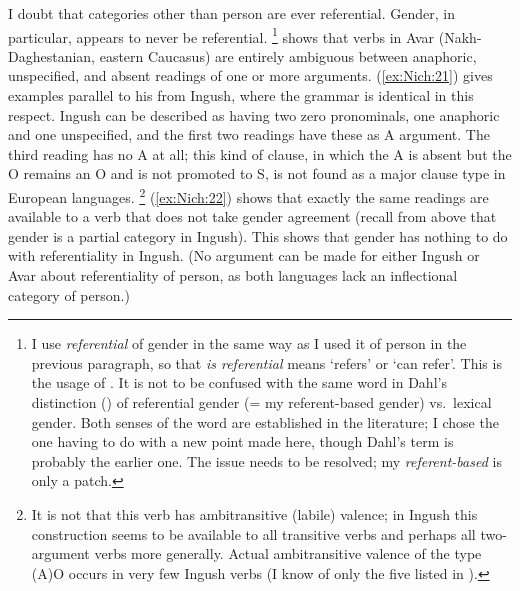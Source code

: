 \documentclass[output=collectionpaper]{langsci/langscibook}
\begin{document}
I doubt that categories other than person are ever referential.  Gender, in particular, appears to never be referential.%
\footnote{%
\label{fn:Nich:15}
I use \textit{referential} of gender in the same way as I used it of person in the previous paragraph, so that \textit{is referential} means `refers' or `can refer'.  This is the usage of \citet{Kibrik2011}.  It is not to be confused with the same word in Dahl's distinction (\citealt*{Dahl2000a}) of referential gender (= my referent-based gender) vs.\ lexical gender.  Both senses of the word are established in the literature; I chose the one having to do with a new point made here, though Dahl's term is probably the earlier one.  The issue needs to be resolved; my \textit{referent-based} is only a patch.
} %
\citet{Creissels2014b} shows that verbs in Avar (Nakh-Daghestanian, eastern Caucasus) are entirely ambiguous between anaphoric, unspecified, and absent readings of one or more arguments. (\ref{ex:Nich:21}) gives examples parallel to his from Ingush, where the grammar is identical in this respect. Ingush can be described as having two zero pronominals, one anaphoric and one unspecified, and the first two readings have these as A argument. The third reading has no A at all; this kind of clause, in which the A is absent but the O remains an O and is not promoted to S, is not found as a major clause type in European languages.%
\footnote{%
It is not that this verb has ambitransitive (labile) valence; in Ingush this construction seems to be available to all transitive verbs and perhaps all two-argument verbs more generally. Actual ambitransitive valence of the type (A)O occurs in very few Ingush verbs (I know of only the five listed in \citealt[466--467]{Nichols2011}).
} %
(\ref{ex:Nich:22}) shows that exactly the same readings are available to a verb that does not take gender agreement (recall from above that gender is a partial category in Ingush).  This shows that gender has nothing to do with referentiality in Ingush. (No argument can be made for either Ingush or Avar about referentiality of person, as both languages lack an inflectional category of person.)
\end{document}
